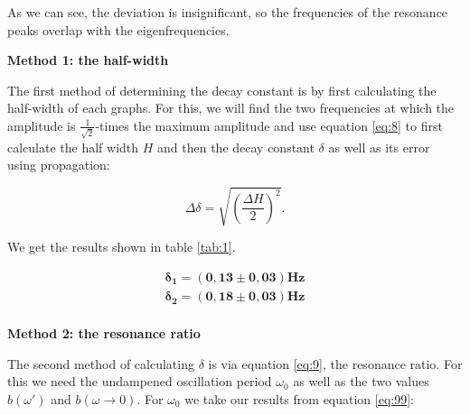 \documentclass{article}
\begin{document}
As we can see, the deviation is insignificant, so the frequencies of the resonance peaks overlap with the eigenfrequencies.

\bigskip

\textbf{Method 1: the half-width}

The first method of determining the decay constant is by first calculating the half-width of each graphs. For this, we will find the two frequencies at which the amplitude is $\frac{1}{\sqrt{2}}$-times the maximum amplitude and use equation \ref{eq:8} to first calculate the half width $H$ and then the decay constant $\delta$ as well as its error using propagation:

\begin{equation}
    \Delta \delta = \sqrt{\left( \frac{\Delta H}{2} \right)^2}.
    \label{eq:91}
\end{equation}

We get the results shown in table \ref{tab:1}.

\begin{table} [!ht]
    \centering
    \caption{calculating the decay constant via the half-width}
    \bigskip
    \label{tab:1}
\end{table}

\begin{equation}
    \begin{split}
        \bm{\delta_1} = \bm{(0,13 \pm 0,03)} \textbf{Hz} \\
        \bm{\delta_2} = \bm{(0,18 \pm 0,03)} \textbf{Hz} \\
    \end{split}
\end{equation}

\newpage

\textbf{Method 2: the resonance ratio}

The second method of calculating $\delta$ is via equation \ref{eq:9}, the resonance ratio. For this we need the undampened oscillation period $\omega_0$ as well as the two values $b(\omega')$ and $b(\omega \rightarrow 0)$. For $\omega_0$ we take our results from equation \ref{eq:99}:
\end{document}
